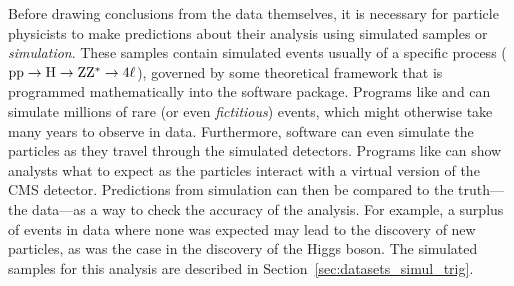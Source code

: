 Before drawing conclusions from the data themselves, it is necessary for particle physicists to make predictions about their analysis using simulated samples or \emph{simulation}.
These samples contain simulated events usually of a specific process (\eg $\mathrm{p} \mathrm{p} \to \mathrm{H} \to \mathrm{Z}\mathrm{Z}^{\ast} \to 4\ell$), governed by some theoretical framework that is programmed mathematically into the software package.
Programs like \MGvATNLO and \POWHEG can simulate millions of rare (or even \emph{fictitious}) events, which might otherwise take many years to observe in data.
Furthermore, software can even simulate the particles as they travel through the simulated detectors.
Programs like \GEANTfour can show analysts what to expect as the particles interact with a virtual version of the CMS detector.
Predictions from simulation can then be compared to the truth---the data---as a way to check the accuracy of the analysis.
For example, a surplus of events in data where none was expected may lead to the discovery of new particles, as was the case in the discovery of the Higgs boson.
The simulated samples for this analysis are described in Section~\ref{sec:datasets_simul_trig}.

